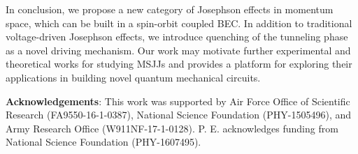 \documentclass[twocolumn,prl,floatfix,citeautoscript,nofootinbib,superscriptaddress]{revtex4}
\begin{document}
In conclusion, we propose a new category of Josephson effects in momentum
space, which can be built in a spin-orbit coupled BEC. In addition to
traditional voltage-driven Josephson effects, we introduce quenching of the
tunneling phase as a novel driving mechanism. Our work may motivate further
experimental and theoretical works for studying MSJJs and provides a
platform for exploring their applications in building novel quantum
mechanical circuits.

\begin{acknowledgments}
\textbf{Acknowledgements}: This work was supported by Air Force Office of
Scientific Research (FA9550-16-1-0387), National Science Foundation
(PHY-1505496), and Army Research Office (W911NF-17-1-0128). P. E.
acknowledges funding from National Science Foundation (PHY-1607495).
\end{acknowledgments}
\end{document}
